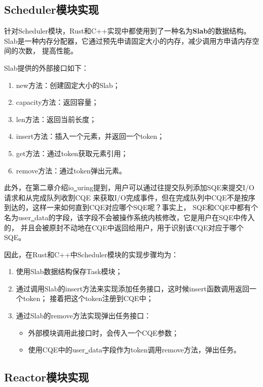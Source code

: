 \documentclass[supercite]{HustGraduPaper}
\theoremstyle{definition}
\begin{document}
\subsection{Scheduler模块实现}

针对Scheduler模块，Rust和C++实现中都使用到了一种名为\textbf{Slab}的数据结构。
Slab是一种内存分配器，它通过预先申请固定大小的内存，减少调用方申请内存空间的次数，
提高性能。\par

Slab提供的外部接口如下：

\begin{enumerate}
  \item new方法：创建固定大小的Slab；
  \item capacity方法：返回容量；
  \item len方法：返回当前长度；
  \item insert方法：插入一个元素，并返回一个token；
  \item get方法：通过token获取元素引用；
  \item remove方法：通过token弹出元素。
\end{enumerate}

此外，在第二章介绍io\underline{~}uring提到，用户可以通过往提交队列添加SQE来提交I/O请求和从完成队列收割CQE
来获取I/O完成事件，但在完成队列中CQE不是按序到达的，这样一来如何直到CQE对应哪个SQE呢？事实上，
SQE和CQE中都有个名为user\underline{~}data的字段，该字段不会被操作系统内核修改，它是用户在SQE中传入的，
并且会被原封不动地在CQE中返回给用户，用于识别该CQE对应于哪个SQE。\par

因此，在Rust和C++中Scheduler模块的实现步骤均为：

\begin{enumerate}
  \item 使用Slab数据结构保存Task模块；
  \item 通过调用Slab的insert方法来实现添加任务接口，这时候insert函数调用返回一个token；
    接着把这个token注册到CQE中；
  \item 通过Slab的remove方法实现弹出任务接口：
    \begin{itemize}
      \item 外部模块调用此接口时，会传入一个CQE参数；
      \item 使用CQE中的user\underline{~}data字段作为token调用remove方法，弹出任务。
    \end{itemize}
\end{enumerate}

\subsection{Reactor模块实现}
\end{document}

